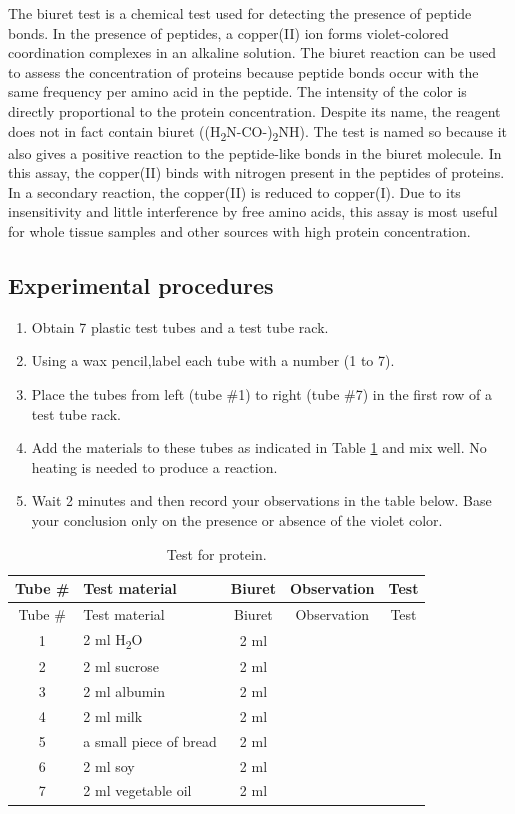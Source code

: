 The biuret test is a chemical test used for detecting the presence of
peptide bonds. In the presence of peptides, a copper(II) ion forms
violet-colored coordination complexes in an alkaline solution. The
biuret reaction can be used to assess the concentration of proteins
because peptide bonds occur with the same frequency per amino acid in
the peptide. The intensity of the color is directly proportional to the
protein concentration. Despite its name, the reagent does not in fact
contain biuret ((H\textsubscript{2}N-CO-)\textsubscript{2}NH). The test
is named so because it also gives a positive reaction to the
peptide-like bonds in the biuret molecule. In this assay, the copper(II)
binds with nitrogen present in the peptides of proteins. In a secondary
reaction, the copper(II) is reduced to copper(I). Due to its
insensitivity and little interference by free amino acids, this assay is
most useful for whole tissue samples and other sources with high protein
concentration.

\subsection{Experimental procedures}\label{experimental-procedures-3}

\begin{enumerate}
\def\labelenumi{\arabic{enumi}.}
\tightlist
\item
  Obtain 7 plastic test tubes and a test tube rack.
\item
  Using a wax pencil,label each tube with a number (1 to 7).
\item
  Place the tubes from left (tube \#1) to right (tube \#7) in the first
  row of a test tube rack.
\item
  Add the materials to these tubes as indicated in Table
  \ref{tab:protein} and mix well. No heating is needed to produce a
  reaction.
\item
  Wait 2 minutes and then record your observations in the table below.
  Base your conclusion only on the presence or absence of the violet
  color.
\end{enumerate}

\begin{longtable}[]{@{}clccc@{}}
\caption{\label{tab:protein} Test for protein.}\tabularnewline
\toprule
Tube \# & Test material & Biuret & Observation & Test\tabularnewline
\midrule
\endfirsthead
\toprule
Tube \# & Test material & Biuret & Observation & Test\tabularnewline
\midrule
\endhead
1 & 2 ml H\textsubscript{2}O & 2 ml & &\tabularnewline
2 & 2 ml sucrose & 2 ml & &\tabularnewline
3 & 2 ml albumin & 2 ml & &\tabularnewline
4 & 2 ml milk & 2 ml & &\tabularnewline
5 & a small piece of bread & 2 ml & &\tabularnewline
6 & 2 ml soy & 2 ml & &\tabularnewline
7 & 2 ml vegetable oil & 2 ml & &\tabularnewline
\bottomrule
\end{longtable}

